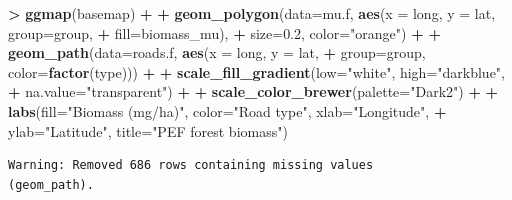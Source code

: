 \documentclass[]{krantz}
\makeatletter
\newenvironment{Shaded}{\begin{snugshade}}{\end{snugshade}}
\newcommand{\DataTypeTok}[1]{\textcolor[rgb]{0.27,0.27,0.27}{#1}}
\newcommand{\FloatTok}[1]{\textcolor[rgb]{0.06,0.06,0.06}{#1}}
\newcommand{\KeywordTok}[1]{\textcolor[rgb]{0.27,0.27,0.27}{\textbf{#1}}}
\newcommand{\NormalTok}[1]{#1}
\newcommand{\OperatorTok}[1]{\textcolor[rgb]{0.43,0.43,0.43}{\textbf{#1}}}
\newcommand{\StringTok}[1]{\textcolor[rgb]{0.5,0.5,0.5}{#1}}
\newenvironment{kframe}{%
\medskip{}
\setlength{\fboxsep}{.8em}
 \def\at@end@of@kframe{}%
 \ifinner\ifhmode%
  \def\at@end@of@kframe{\end{minipage}}%
  \begin{minipage}{\columnwidth}%
 \fi\fi%
 \def\FrameCommand##1{\hskip\@totalleftmargin \hskip-\fboxsep
 \colorbox{shadecolor}{##1}\hskip-\fboxsep
     \hskip-\linewidth \hskip-\@totalleftmargin \hskip\columnwidth}%
 \MakeFramed {\advance\hsize-\width
   \@totalleftmargin\z@ \linewidth\hsize
   \@setminipage}}%
 {\par\unskip\endMakeFramed%
 \at@end@of@kframe}
\renewenvironment{Shaded}{\begin{kframe}}{\end{kframe}}
\makeatother
\begin{document}
\begin{Shaded}
\begin{Highlighting}[]
\OperatorTok{>}\StringTok{ }\KeywordTok{ggmap}\NormalTok{(basemap) }\OperatorTok{+}
\OperatorTok{+}\StringTok{     }\KeywordTok{geom_polygon}\NormalTok{(}\DataTypeTok{data=}\NormalTok{mu.f, }\KeywordTok{aes}\NormalTok{(}\DataTypeTok{x =}\NormalTok{ long, }\DataTypeTok{y =}\NormalTok{ lat, }\DataTypeTok{group=}\NormalTok{group, }
\OperatorTok{+}\StringTok{                                 }\DataTypeTok{fill=}\NormalTok{biomass_mu), }
\OperatorTok{+}\StringTok{                  }\DataTypeTok{size=}\FloatTok{0.2}\NormalTok{, }\DataTypeTok{color=}\StringTok{"orange"}\NormalTok{) }\OperatorTok{+}
\OperatorTok{+}\StringTok{     }\KeywordTok{geom_path}\NormalTok{(}\DataTypeTok{data=}\NormalTok{roads.f, }\KeywordTok{aes}\NormalTok{(}\DataTypeTok{x =}\NormalTok{ long, }\DataTypeTok{y =}\NormalTok{ lat, }
\OperatorTok{+}\StringTok{                                 }\DataTypeTok{group=}\NormalTok{group, }\DataTypeTok{color=}\KeywordTok{factor}\NormalTok{(type))) }\OperatorTok{+}
\OperatorTok{+}\StringTok{     }\KeywordTok{scale_fill_gradient}\NormalTok{(}\DataTypeTok{low=}\StringTok{"white"}\NormalTok{, }\DataTypeTok{high=}\StringTok{"darkblue"}\NormalTok{, }
\OperatorTok{+}\StringTok{                         }\DataTypeTok{na.value=}\StringTok{"transparent"}\NormalTok{) }\OperatorTok{+}
\OperatorTok{+}\StringTok{     }\KeywordTok{scale_color_brewer}\NormalTok{(}\DataTypeTok{palette=}\StringTok{"Dark2"}\NormalTok{) }\OperatorTok{+}
\OperatorTok{+}\StringTok{     }\KeywordTok{labs}\NormalTok{(}\DataTypeTok{fill=}\StringTok{"Biomass (mg/ha)"}\NormalTok{, }\DataTypeTok{color=}\StringTok{"Road type"}\NormalTok{, }\DataTypeTok{xlab=}\StringTok{"Longitude"}\NormalTok{, }
\OperatorTok{+}\StringTok{          }\DataTypeTok{ylab=}\StringTok{"Latitude"}\NormalTok{, }\DataTypeTok{title=}\StringTok{"PEF forest biomass"}\NormalTok{)}
\end{Highlighting}
\end{Shaded}

\begin{verbatim}
Warning: Removed 686 rows containing missing values
(geom_path).
\end{verbatim}
\end{document}
